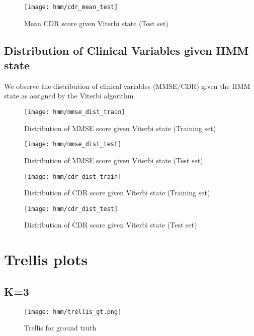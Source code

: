 \documentclass[12pt,a4paper]{article}
\begin{document}
\begin{figure}[H]
  \centering
  \texttt{[image: hmm/cdr\_mean\_test]}
  \caption{Mean CDR score given Viterbi state (Test set)}  
\end{figure}

\subsection{Distribution of Clinical Variables given HMM state}
\label{sec:dist-heatmap}

We observe the distribution of clinical variables (MMSE/CDR) given the
HMM state as assigned by the Viterbi algorithm

\begin{figure}[H]
  \centering
  \texttt{[image: hmm/mmse\_dist\_train]}
  \caption{Distribution of MMSE score given Viterbi state (Training set)}  
\end{figure}

\begin{figure}[H]
  \centering
  \texttt{[image: hmm/mmse\_dist\_test]}
  \caption{Distribution of MMSE score given Viterbi state (Test set)}  
\end{figure}

\begin{figure}[H]
  \centering
  \texttt{[image: hmm/cdr\_dist\_train]}
  \caption{Distribution of CDR score given Viterbi state (Training set)}  
\end{figure}

\begin{figure}[H]
  \centering
  \texttt{[image: hmm/cdr\_dist\_test]}
  \caption{Distribution of CDR score given Viterbi state (Test set)}  
\end{figure}

\section{Trellis plots}

\subsection{K=3}

\begin{figure}[H]
  \centering
  \texttt{[image: hmm/trellis\_gt.png]}
  \caption{Trellis for ground truth}  
\end{figure}
\end{document}
